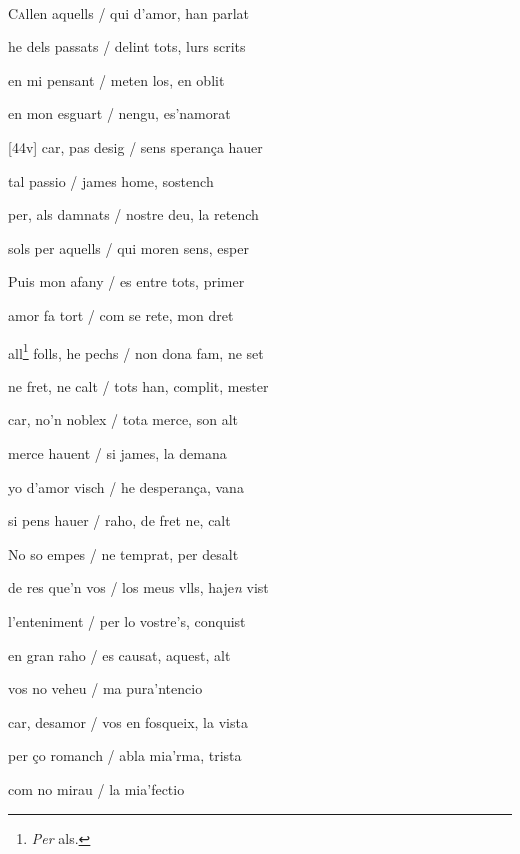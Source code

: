 \documentclass[12pt]{article}
\renewcommand{\espaiAbansEtiquetaPoema}{\vspace{0ex}}
\begin{document}
\begin{estrofa}

\espaiAbansEtiquetaPoema

\\

\end{estrofa}


\begin{estrofa}

 C\textsc{a}llen aquells / qui d'amor, han parlat

 he dels passats / delint tots, lurs scrits

 en mi pensant / meten los, en oblit

 en mon esguart / nengu, es'namorat

 [44v] car, pas desig / sens speran\c{c}a hauer

 tal passio / james home, sostench

 per, als damnats / nostre deu, la retench

 sols per aquells / qui moren sens, esper

\end{estrofa}



\begin{estrofa}

 Puis mon afany / es entre tots, primer

 amor fa tort / com se rete, mon dret

 all\footnote{\textit{Per }als.} folls, he pechs / non dona fam, ne set

 ne fret, ne calt / tots han, complit, mester

 car, no'n noblex / tota merce, son alt

 merce hauent / si james, la demana

 yo d'amor visch / he desperan\c{c}a, vana

 si pens hauer / raho, de fret ne, calt

\end{estrofa}



\begin{estrofa}

 No so empes / ne temprat, per desalt

 de res que'n vos / los meus vlls, haje\textit{n} vist

 l'enteniment / per lo vostre's, conquist

 en gran raho / es causat, aquest, alt

 vos no veheu / ma pura'ntencio

 car, desamor / vos en fosqueix, la vista

 per \c{c}o romanch / abla mia'rma, trista

 com no mirau / la mia'fectio

\end{estrofa}
\end{document}
